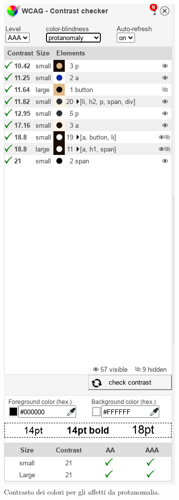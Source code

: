\documentclass{template}
\begin{document}
	\begin{figure}[H]
		\centering
		\includegraphics[scale=0.6]{src/contrasti/protanomaly.png}
		\caption{Contrasto dei colori per gli affetti da protanomalia.}
	\end{figure}
	\pagebreak
\end{document}
